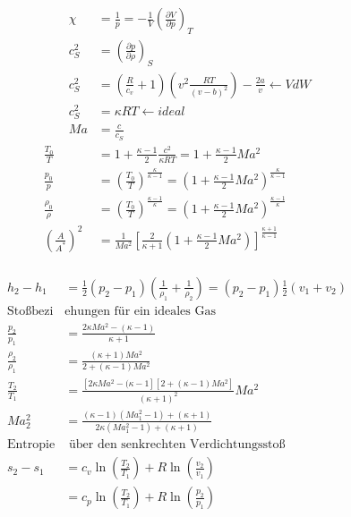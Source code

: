 \documentclass[twocolumn]{article}
\begin{document}
\begin{multicols}{2}
\begin{align*}
	\qquad  \chi &= \frac{1}{p} = - \frac{1}{V}\left(\frac{\partial V}{\partial p}\right)_{T}  \\
	\qquad c_S^2 &= \left(\frac{\partial p}{\partial \rho}\right)_{S} \\
	\qquad c_S^2 &= \left(\frac{R}{c_v}+ 1\right)\left(v^2 \frac{RT}{(v-b)^2}\right) - \frac{2a}{v}\leftarrow VdW \\
	\qquad c_S^2 &= \kappa RT \leftarrow ideal\\
	\qquad Ma &= \frac{c}{c_S} \\
		\frac{T_0}{T} &= 1 + \frac{\kappa -1}{2} \frac{c^2}{\kappa RT} = 1 + \frac{\kappa -1}{2}Ma^2 \\
		\frac{p_0}{p} &= \left(\frac{T_0}{T}\right)^{\frac{\kappa}{\kappa-1}} = \left(1 + \frac{\kappa -1}{2}Ma^2\right)^{\frac{\kappa}{\kappa-1}} \\
		\frac{\rho_0}{\rho} &= \left(\frac{T_0}{T}\right)^{\frac{\kappa-1}{\kappa}} = \left(1 + \frac{\kappa -1}{2}Ma^2\right)^{\frac{\kappa -1 }{\kappa}} \\
		\left(\frac{A}{A^{*}}\right)^2 &= \frac{1}{Ma^2}\left[\frac{2}{\kappa + 1}\left( 1 + \frac{\kappa -1}{2} Ma^2 \right)\right]^{\frac{\kappa +1}{\kappa -1}} \\
\end{align*}

	\begin{align*}
		h_2 - h_1 &= \frac{1}{2}(p_2 - p_1) \left(\frac{1}{\rho_1} + \frac{1}{\rho_2}\right) = (p_2 -p_1) \frac{1}{2}(v_1 + v_2) \\
		\text{Stoßbezi}&\text{ehungen für ein ideales Gas} \\
		\frac{p_2}{p_1} &= \frac{2 \kappa Ma^2 - (\kappa -1)}{\kappa +1} \\
		\frac{\rho_2}{\rho_1} &= \frac{(\kappa +1 ) Ma^2}{2 + (\kappa -1) Ma^2} \\
		\frac{T_2}{T_1} &= \frac{\left[2\kappa Ma^2 - (\kappa -1 \right]\left[2 + (\kappa -1) Ma^2\right]}{(\kappa +1)^2}Ma^2 \\
		Ma_2^2 &= \frac{(\kappa -1)(Ma_1^2 -1) + (\kappa +1)}{2\kappa (Ma_1^2 -1 ) + (\kappa +1)} \\
		\text{Entropie}&\text{ über den senkrechten Verdichtungsstoß} \\
		s_2 -s_1 &= c_v \ln \left(\frac{T_2}{T_1}\right) + R \ln\left(\frac{v_2}{v_1}\right) \\
			 &= c_p \ln \left(\frac{T_2}{T_1}\right) + R \ln\left(\frac{p_2}{p_1}\right) \\
	\end{align*}


\end{multicols}
\end{document}
